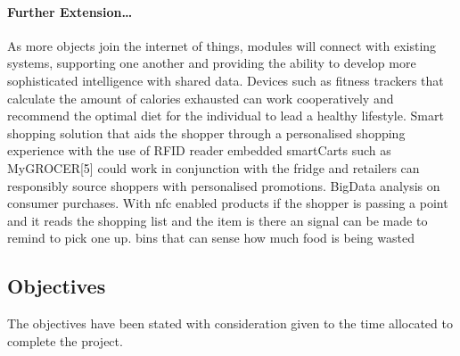 \documentclass[a4paper, 11pt]{article}
\begin{document}
\paragraph{Further Extension\dots} As more objects join the internet of things, modules will connect with existing systems, supporting one another and providing the ability to develop more sophisticated intelligence with shared data. Devices such as fitness trackers that calculate the amount of calories exhausted can work cooperatively and recommend the optimal diet for the individual to lead a healthy lifestyle. Smart shopping solution that aids the shopper through a personalised shopping experience with the use of RFID reader embedded smartCarts such as MyGROCER[5] could work in conjunction with the fridge and retailers can responsibly source shoppers with personalised promotions. BigData analysis on consumer purchases. With nfc enabled products if the shopper is passing a point and it reads the shopping list and the item is there an signal can be made to remind to pick one up. bins that can sense how much food is being wasted

\fi

\clearpage
\subsection{Objectives}

The objectives have been stated with consideration given to the time allocated to complete the project. 
\end{document}
